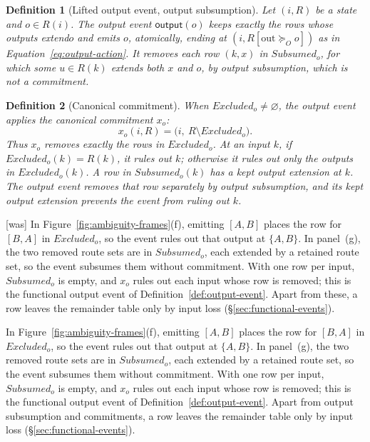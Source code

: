 \documentclass[sigconf]{cidr-2027}
\newtheorem{definition}{Definition}
\theoremstyle{remark}
\newcommand{\OutputGe}{\succeq_O}
\newcommand{\commitment}{commitment\xspace}
\newcommand{\commitments}{commitments\xspace}
\newcommand{\outrel}{extends\xspace}          %
\newcommand{\outrelbase}{extend\xspace}       %
\newcommand{\outrelpast}{extended\xspace}     %
\newcommand{\outnoun}{output extension\xspace}%
\newcommand{\Subsumed}{\mathit{Subsumed}}
\newcommand{\Excluded}{\mathit{Excluded}}
\begin{document}
\begin{definition}[Lifted output event, output subsumption]
\label{def:lifted-output-event}
Let $(i,R)$ be a state and $o\in R(i)$.  The \emph{output event}
$\mathsf{output}(o)$ keeps exactly the rows whose outputs \outrelbase $o$ and
emits $o$, atomically, ending at $(i,R[\mathrm{out}\OutputGe o])$ as in
Equation~\ref{eq:output-action}.  It removes each row $(k,x)$ in
$\Subsumed_o$, for which some $u\in R(k)$ \outrel both $x$ and $o$, by
\emph{output subsumption}, which is not a \commitment.
\end{definition}

\begin{definition}[Canonical \commitment]
\label{def:canonical-commitment}
When $\Excluded_o\neq\varnothing$, the output event applies the \emph{canonical
\commitment} $x_o$:
\begin{equation}
  x_o(i,R)=\bigl(i,\ R\setminus\Excluded_o\bigr).
  \label{eq:canonical-commitment-relational}
\end{equation}
  Thus $x_o$ removes exactly the rows in $\Excluded_o$.  At an input $k$, if
  $\Excluded_o(k)=R(k)$, it rules out $k$; otherwise it rules out only the
  outputs in $\Excluded_o(k)$.  A row in $\Subsumed_o(k)$ has a kept \outnoun
  at $k$.  The output event removes that row separately by output subsumption,
  and its kept \outnoun prevents the event from ruling out $k$.
\end{definition}



{\footnotesize\color{black!50}\noindent\textsf{[was]} In Figure~\ref{fig:ambiguity-frames}(f), emitting $[A,B]$ places the row for
$[B,A]$ in $\Excluded_o$, so the event rules out that output at $\{A,B\}$.
In panel~(g), the two removed route sets are in $\Subsumed_o$, each
\outrelpast by a retained route set, so the event subsumes them without
\commitment.  With one row per input, $\Subsumed_o$ is empty, and $x_o$ rules
out each input whose row is removed; this is the functional output event of
Definition~\ref{def:output-event}.  Apart from these, a row leaves the
remainder table only by input loss (\S\ref{sec:functional-events}).\par}

\color{blue!70!black}In Figure~\ref{fig:ambiguity-frames}(f), emitting $[A,B]$ places the row for
$[B,A]$ in $\Excluded_o$, so the event rules out that output at $\{A,B\}$.
In panel~(g), the two removed route sets are in $\Subsumed_o$, each
\outrelpast by a retained route set, so the event subsumes them without
\commitment.  With one row per input, $\Subsumed_o$ is empty, and $x_o$ rules
out each input whose row is removed; this is the functional output event of
Definition~\ref{def:output-event}.  Apart from output subsumption and
\commitments, a row leaves the remainder table only by input loss
(\S\ref{sec:functional-events}).\color{black}
\end{document}
